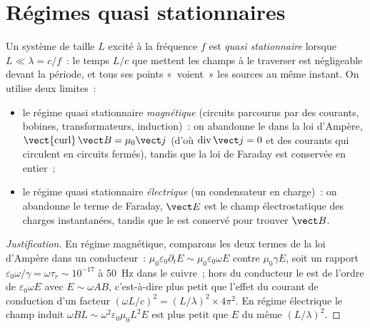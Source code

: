 \section{Régimes quasi stationnaires}

\begin{definition}\label{def:b2:maxwell-equations:arqs}
Un système de taille $L$ excité à la fréquence $f$ est \emph{quasi stationnaire}
lorsque $L \ll \lambda = c/f$~: le temps $L/c$ que mettent les champs à le traverser est
négligeable devant la période, et tous ses points «~voient~» les
sources au même instant. On utilise deux limites~:
\begin{itemize}
  \item le régime quasi stationnaire \emph{magnétique} (circuits parcourus par des
        courants, bobines, transformateurs, induction)~: on abandonne le  dans la loi d'Ampère, $\operatorname{\vect{curl}}\vect B
        = \mu_0\vect j$ (d'où $\operatorname{div}\vect j = 0$ et des courants qui circulent en
        circuits fermés), tandis que la loi de Faraday est conservée en entier~;
  \item le régime quasi stationnaire \emph{électrique} (un condensateur en
        charge)~: on abandonne le terme de Faraday, $\vect E$ est le
        champ électrostatique des charges instantanées, tandis que le
         est conservé pour trouver $\vect B$.
\end{itemize}
\end{definition}

\begin{proof}[Justification]
En régime magnétique, comparons les deux termes de la loi d'Ampère dans un
conducteur~: $\mu_0\varepsilon_0\partial_t E \sim \mu_0\varepsilon_0\omega E$ contre $\mu_0\gamma E$,
soit un rapport $\varepsilon_0\omega/\gamma = \omega\tau_r \sim 10^{-17}$ à \qty{50}{Hz} dans le cuivre~;
hors du conducteur le  est de l'ordre de
$\varepsilon_0\omega E$ avec $E \sim \omega AB$, c'est-à-dire plus petit que l'effet du courant
de conduction d'un facteur $(\omega L/c)^2 = (L/\lambda)^2 \times 4\pi^2$. En régime électrique
le champ induit $\omega BL \sim \omega^2\varepsilon_0\mu_0L^2E$ est plus petit que $E$
du même $(L/\lambda)^2$.
\end{proof}

